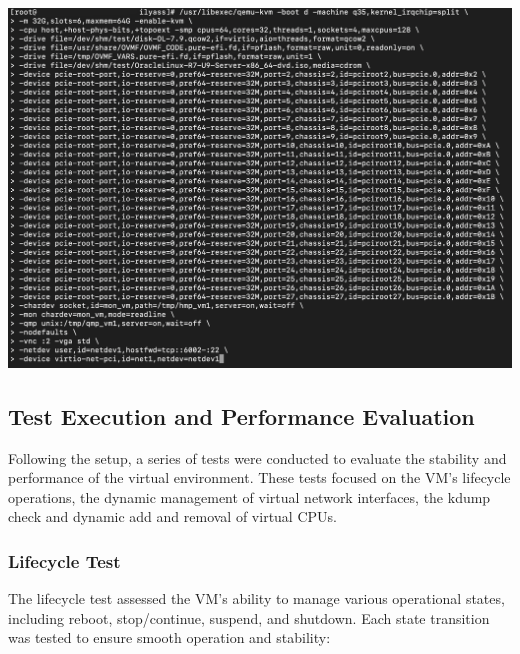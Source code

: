 \begin{center}
    \centering
    \includegraphics[width=\textwidth]{Images/Launching Guest 2.png}
    \label{fig:casa}
\end{center}

\subsection{Test Execution and Performance Evaluation}
Following the setup, a series of tests were conducted to evaluate the stability and performance of the virtual environment. These tests focused on the VM's lifecycle operations, the dynamic management of virtual network interfaces, the kdump check and dynamic add and removal of virtual CPUs.

\subsubsection[Lifecycle Test]{Lifecycle Test}

The lifecycle test assessed the VM’s ability to manage various operational states, including reboot, stop/continue, suspend, and shutdown. Each state transition was tested to ensure smooth operation and stability:
\noindent

